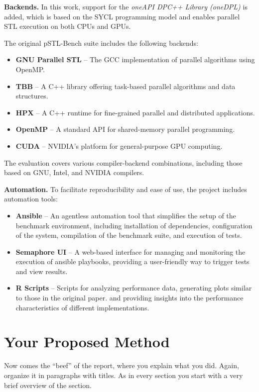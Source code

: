 \documentclass[sigconf]{acmart}
\newcommand{\mypar}[1]{{\bf #1.}}
\begin{document}
\mypar{Backends} In this work, support for the \textit{oneAPI DPC++ Library (oneDPL)} is added, which is based on the SYCL
programming model and enables parallel STL execution on both CPUs and GPUs.

The original pSTL-Bench suite includes the following backends:
\begin{itemize}
  \item \textbf{GNU Parallel STL} – The GCC implementation of parallel algorithms using OpenMP.
  \item \textbf{TBB} – A C++ library offering task-based parallel algorithms and data structures.
  \item \textbf{HPX} – A C++ runtime for fine-grained parallel and distributed applications.
  \item \textbf{OpenMP} – A standard API for shared-memory parallel programming.
  \item \textbf{CUDA} – NVIDIA’s platform for general-purpose GPU computing.
\end{itemize}

The evaluation covers various compiler-backend combinations, including those
based on GNU, Intel, and NVIDIA compilers.

\mypar{Automation} To facilitate reproducibility and ease of use, the project includes automation tools:
\begin{itemize}
  \item \textbf{Ansible} – An agentless automation tool that simplifies the setup of the benchmark environment,
        including installation of dependencies, configuration of the system, compilation of the benchmark suite, and execution of tests.
  \item \textbf{Semaphore UI} – A web-based interface for managing and monitoring the execution of ansible playbooks,
        providing a user-friendly way to trigger tests and view results.
  \item \textbf{R Scripts} – Scripts for analyzing performance data, generating plots similar to those in the original paper.
        and providing insights into the performance characteristics of different implementations.
\end{itemize}

\section{Your Proposed Method}\label{sec:yourmethod}

Now comes the ``beef'' of the report, where you explain what you did. Again,
organize it in paragraphs with titles. As in every section you start with a
very brief overview of the section.
\end{document}
